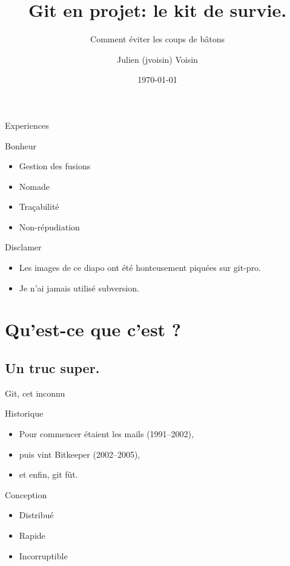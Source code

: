 \documentclass[xcolor=svgnames,12pt]{beamer}
\title{Git en projet: le kit de survie.}
\subtitle{Comment éviter les coups de bâtons}
\author{Julien (jvoisin) Voisin}
\date{\today{}}
\institute{hackgyver (Belfort)}
\begin{document}
\begin{frame}
    \maketitle
\end{frame}

\begin{frame}
    \tableofcontents
\end{frame}

\begin{frame}{Experiences}
    \begin{block}{Bonheur}
    \begin{itemize}[<+->]
            \item Gestion des fusions
            \item Nomade
            \item Traçabilité
            \item Non-répudiation
        \end{itemize}
    \end{block}
\end{frame}

\begin{frame}{Disclamer}
    \begin{itemize}
        \item Les images de ce diapo ont été honteusement piquées sur git-pro.
        \item Je n'ai jamais utilisé subversion.
    \end{itemize}
\end{frame}

\section{Qu'est-ce que c'est ?}
\subsection{Un truc super.}
\begin{frame}{Git, cet inconnu}
    \begin{block}{Historique}
        \begin{itemize}
            \item Pour commencer étaient les mails (1991--2002),
            \item puis vint Bitkeeper (2002--2005),
            \item et enfin, git fût.
        \end{itemize}
    \end{block}
    \pause
    \begin{block}{Conception}
        \begin{itemize}
            \item Distribué
            \item Rapide
            \item Incorruptible
        \end{itemize}
    \end{block}
\end{frame}
\end{document}
